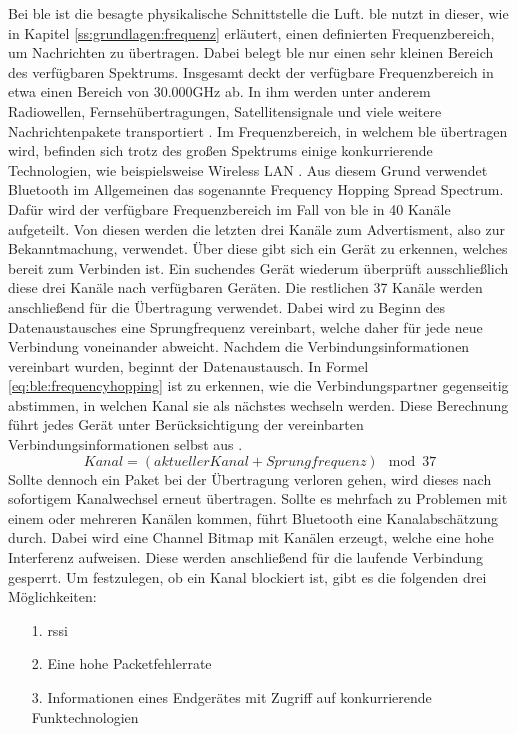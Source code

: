 \noindent Bei \ac{ble} ist die besagte physikalische Schnittstelle die Luft. \ac{ble} nutzt in dieser, wie in Kapitel \ref{ss:grundlagen:frequenz} erläutert, einen definierten Frequenzbereich, um Nachrichten zu übertragen. Dabei belegt \ac{ble} nur einen sehr kleinen Bereich des verfügbaren Spektrums. Insgesamt deckt der verfügbare Frequenzbereich in etwa einen Bereich von 30.000GHz ab. In ihm werden unter anderem Radiowellen, Fernsehübertragungen, Satellitensignale und viele weitere Nachrichtenpakete transportiert \cite[Seite 107]{Tanenbaum14:CN}. Im Frequenzbereich, in welchem \ac{ble} übertragen wird, befinden sich trotz des großen Spektrums einige konkurrierende Technologien, wie beispielsweise Wireless LAN \cite[Seite 17]{Townsend14:GSB}. Aus diesem Grund verwendet Bluetooth im Allgemeinen das sogenannte Frequency Hopping Spread Spectrum. Dafür wird der verfügbare Frequenzbereich im Fall von \ac{ble} in 40 Kanäle aufgeteilt. Von diesen werden die letzten drei Kanäle zum Advertisment, also zur Bekanntmachung, verwendet. Über diese gibt sich ein Gerät zu erkennen, welches bereit zum Verbinden ist. Ein suchendes Gerät wiederum überprüft ausschließlich diese drei Kanäle nach verfügbaren Geräten. Die restlichen 37 Kanäle werden anschließend für die Übertragung verwendet. Dabei wird zu Beginn des Datenaustausches eine Sprungfrequenz vereinbart, welche daher für jede neue Verbindung voneinander abweicht. Nachdem die Verbindungsinformationen vereinbart wurden, beginnt der Datenaustausch. In Formel \ref{eq:ble:frequencyhopping} ist zu erkennen, wie die Verbindungspartner gegenseitig abstimmen, in welchen Kanal sie als nächstes wechseln werden. Diese Berechnung führt jedes Gerät unter Berücksichtigung der vereinbarten Verbindungsinformationen selbst aus \cite[Seite 17]{Townsend14:GSB}. 
\begin{equation}
\label{eq:ble:frequencyhopping}
Kanal = (aktueller Kanal + Sprungfrequenz) \mod 37
\end{equation}
Sollte dennoch ein Paket bei der Übertragung verloren gehen, wird dieses nach sofortigem Kanalwechsel erneut übertragen. Sollte es mehrfach zu Problemen mit einem oder mehreren Kanälen kommen, führt Bluetooth eine Kanalabschätzung durch. Dabei wird eine Channel Bitmap mit Kanälen erzeugt, welche eine hohe Interferenz aufweisen. Diese werden anschließend für die laufende Verbindung gesperrt. Um festzulegen, ob ein Kanal blockiert ist, gibt es die folgenden drei Möglichkeiten:

\begin{itemize}
	\item[1.]{\ac{rssi}}
	\item[2.]{Eine hohe Packetfehlerrate}
	\item[3.]{Informationen eines Endgerätes mit Zugriff auf konkurrierende Funktechnologien}
\end{itemize}       

